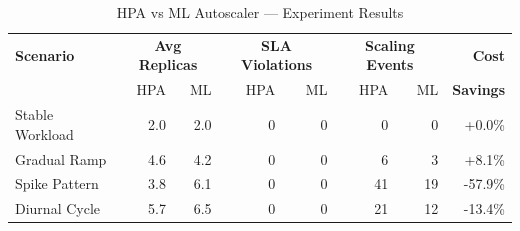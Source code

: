 \begin{table}[htbp]
\centering
\caption{HPA vs ML Autoscaler — Experiment Results}
\label{tab:experiment-results}
\small
\begin{tabular}{l|rr|rr|rr|r}
\hline
\textbf{Scenario} & \multicolumn{2}{c|}{\textbf{Avg Replicas}} & \multicolumn{2}{c|}{\textbf{SLA Violations}} & \multicolumn{2}{c|}{\textbf{Scaling Events}} & \textbf{Cost} \\
& HPA & ML & HPA & ML & HPA & ML & \textbf{Savings} \\
\hline
Stable Workload & 2.0 & 2.0 & 0 & 0 & 0 & 0 & +0.0\% \\
Gradual Ramp & 4.6 & 4.2 & 0 & 0 & 6 & 3 & +8.1\% \\
Spike Pattern & 3.8 & 6.1 & 0 & 0 & 41 & 19 & -57.9\% \\
Diurnal Cycle & 5.7 & 6.5 & 0 & 0 & 21 & 12 & -13.4\% \\
\hline
\end{tabular}
\end{table}